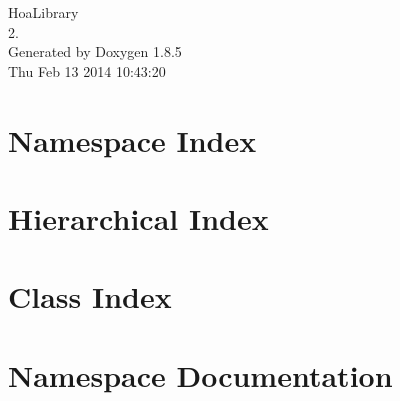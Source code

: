 \documentclass[twoside]{book}
\newcommand{\clearemptydoublepage}{%
  \newpage{\pagestyle{empty}\cleardoublepage}%
}
\begin{document}
\hypersetup{pageanchor=false}
\begin{titlepage}
\vspace*{7cm}
\begin{center}%
{\Large Hoa\-Library \\[1ex]\large 2. }\\
\vspace*{1cm}
{\large Generated by Doxygen 1.8.5}\\
\vspace*{0.5cm}
{\small Thu Feb 13 2014 10:43:20}\\
\end{center}
\end{titlepage}
\clearemptydoublepage
\tableofcontents
\clearemptydoublepage
{}
\hypersetup{pageanchor=true}

\chapter{Namespace Index}

\chapter{Hierarchical Index}

\chapter{Class Index}

\chapter{Namespace Documentation}


\end{document}
